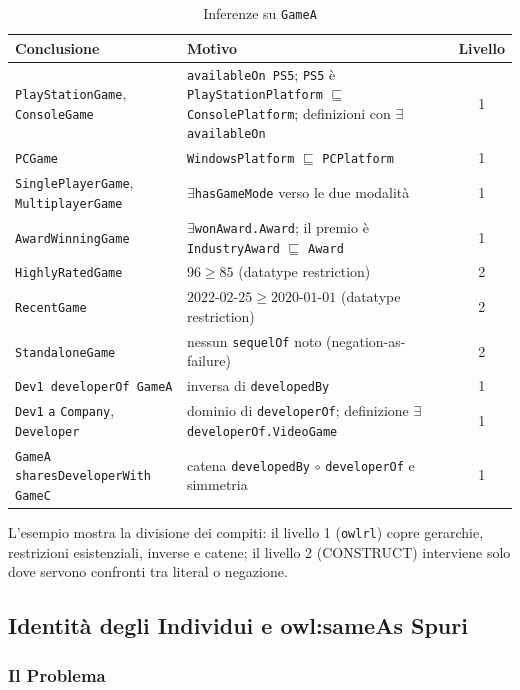 \begin{table}[h]
\centering
\small
\caption{Inferenze su \texttt{GameA}}
\label{tab:inferenza}
\begin{tabularx}{\textwidth}{l X c}
\toprule
\textbf{Conclusione} & \textbf{Motivo} & \textbf{Livello} \\
\midrule
\texttt{PlayStationGame}, \texttt{ConsoleGame} &
  \texttt{availableOn PS5}; \texttt{PS5} \`e \texttt{PlayStationPlatform} $\sqsubseteq$
  \texttt{ConsolePlatform}; definizioni con $\exists$\texttt{availableOn} & 1 \\
\texttt{PCGame} & \texttt{WindowsPlatform} $\sqsubseteq$ \texttt{PCPlatform} & 1 \\
\texttt{SinglePlayerGame}, \texttt{MultiplayerGame} & $\exists$\texttt{hasGameMode} verso le due modalit\`a & 1 \\
\texttt{AwardWinningGame} & $\exists$\texttt{wonAward.Award}; il premio \`e \texttt{IndustryAward} $\sqsubseteq$ \texttt{Award} & 1 \\
\texttt{HighlyRatedGame} & $96 \ge 85$ (datatype restriction) & 2 \\
\texttt{RecentGame} & $2022\text{-}02\text{-}25 \ge 2020\text{-}01\text{-}01$ (datatype restriction) & 2 \\
\texttt{StandaloneGame} & nessun \texttt{sequelOf} noto (negation-as-failure) & 2 \\
\midrule
\texttt{Dev1 developerOf GameA} & inversa di \texttt{developedBy} & 1 \\
\texttt{Dev1} \texttt{a} \texttt{Company}, \texttt{Developer} & dominio di \texttt{developerOf}; definizione $\exists$\texttt{developerOf.VideoGame} & 1 \\
\texttt{GameA sharesDeveloperWith GameC} & catena \texttt{developedBy} $\circ$ \texttt{developerOf} e simmetria & 1 \\
\bottomrule
\end{tabularx}
\end{table}

L'esempio mostra la divisione dei compiti: il livello 1 (\texttt{owlrl}) copre
gerarchie, restrizioni esistenziali, inverse e catene; il livello 2 (CONSTRUCT)
interviene solo dove servono confronti tra literal o negazione.

\subsection{Identit\`a degli Individui e owl:sameAs Spuri}

\subsubsection{Il Problema}

